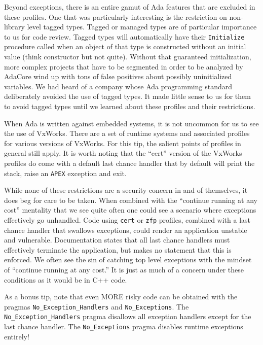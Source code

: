 Beyond exceptions, there is an entire gamut of Ada features that are excluded in these profiles.\autocite[§ 4.2.2]{20210809:gnathie} One that was particularly interesting is the restriction on non-library level tagged types. Tagged or managed types are of particular importance to us for code review. Tagged types will automatically have their \texttt{Initialize} procedure called when an object of that type is constructed without an initial value (think constructor but not quite).\autocite{20210809:adap} Without that guaranteed initialization, more complex projects that have to be segmented in order to be analyzed by AdaCore wind up with tons of false positives about possibly uninitialized variables. We had heard of a company whose Ada programming standard deliberately avoided the use of tagged types. It made little sense to us for them to avoid tagged types until we learned about these profiles and their restrictions.

When Ada is written against embedded systems, it is not uncommon for us to see the use of VxWorks. There are a set of runtime systems and associated profiles for various versions of VxWorks. For this tip, the salient points of profiles in general still apply. It is worth noting that the ``cert'' version of the VxWorks profiles do come with a default last chance handler that by default will print the stack, raise an \texttt{APEX} exception and exit.\autocite[§ A, Replacement of the Default Last Chance Handler]{20210809:gnatugx}

While none of these restrictions are a security concern in and of themselves, it does beg for care to be taken. When combined with the ``continue running at any cost'' mentality that we see quite often one could see a scenario where exceptions effectively go unhandled. Code using \texttt{cert} or \texttt{zfp} profiles, combined with a last chance handler that swallows exceptions, could render an application unstable and vulnerable. Documentation states that all last chance handlers must effectively terminate the application,\autocite[§ 3.1]{20210809:gnathie} but makes no statement that this is enforced. We often see the sin of catching top level exceptions\autocite[\pno~159]{20210809:viega200924} with the mindset of ``continue running at any cost.'' It is just as much of a concern under these conditions as it would be in C++ code.

As a bonus tip, note that even MORE risky code can be obtained with the pragmas \texttt{No\_Exception\_Handlers} and \texttt{No\_Exceptions}. The \texttt{No\_Exception\_Handlers} pragma disallows all exception handlers except for the last chance handler. The \texttt{No\_Exceptions} pragma disables runtime exceptions entirely!\autocite[§ 3.1]{20210809:gnathie}

